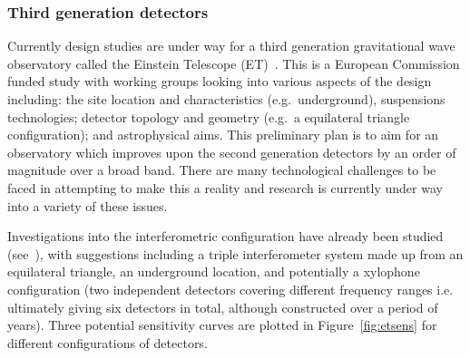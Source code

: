 \documentclass{article}
\begin{document}
\subsubsection{Third generation detectors}\label{subsec:et}

Currently design studies are under way for a third generation gravitational wave
observatory called the Einstein Telescope (ET)~\cite{ETweb}. This is a European
Commission funded study with working groups looking into various aspects of the
design including: the site location and characteristics (e.g.\ underground),
suspensions technologies; detector topology and geometry (e.g.\ a equilateral
triangle configuration); and astrophysical aims. This preliminary plan is to
aim for an observatory which improves upon the second generation detectors by
an order of magnitude over a broad band. There are many technological challenges
to be faced in attempting to make this a reality and research is currently under
way into a variety of these issues.

Investigations into the interferometric configuration have already been studied
(see~\cite{Freise:2008, Hild:2008b, Hild:2010}), with suggestions including a
triple interferometer system made up from an equilateral triangle, an
underground location, and potentially a xylophone configuration (two independent
detectors covering different frequency ranges i.e. ultimately giving six
detectors in total, although constructed over a period of years). Three
potential sensitivity curves are plotted in Figure~\ref{fig:etsens} for different
configurations of detectors.

\end{document}
